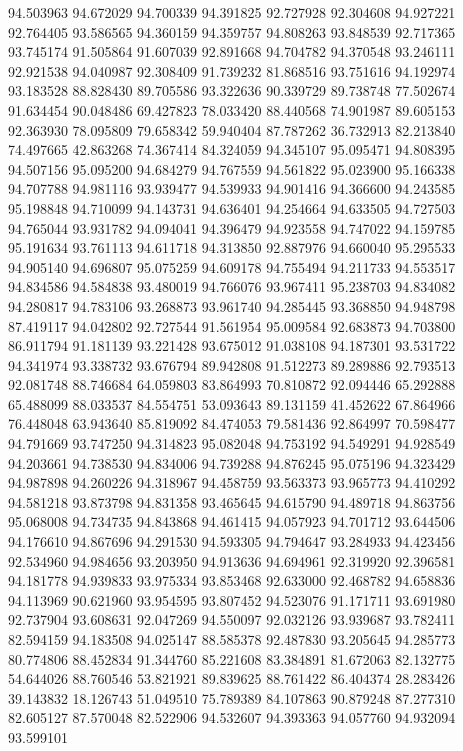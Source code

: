 94.503963
94.672029
94.700339
94.391825
92.727928
92.304608
94.927221
92.764405
93.586565
94.360159
94.359757
94.808263
93.848539
92.717365
93.745174
91.505864
91.607039
92.891668
94.704782
94.370548
93.246111
92.921538
94.040987
92.308409
91.739232
81.868516
93.751616
94.192974
93.183528
88.828430
89.705586
93.322636
90.339729
89.738748
77.502674
91.634454
90.048486
69.427823
78.033420
88.440568
74.901987
89.605153
92.363930
78.095809
79.658342
59.940404
87.787262
36.732913
82.213840
74.497665
42.863268
74.367414
84.324059
94.345107
95.095471
94.808395
94.507156
95.095200
94.684279
94.767559
94.561822
95.023900
95.166338
94.707788
94.981116
93.939477
94.539933
94.901416
94.366600
94.243585
95.198848
94.710099
94.143731
94.636401
94.254664
94.633505
94.727503
94.765044
93.931782
94.094041
94.396479
94.923558
94.747022
94.159785
95.191634
93.761113
94.611718
94.313850
92.887976
94.660040
95.295533
94.905140
94.696807
95.075259
94.609178
94.755494
94.211733
94.553517
94.834586
94.584838
93.480019
94.766076
93.967411
95.238703
94.834082
94.280817
94.783106
93.268873
93.961740
94.285445
93.368850
94.948798
87.419117
94.042802
92.727544
91.561954
95.009584
92.683873
94.703800
86.911794
91.181139
93.221428
93.675012
91.038108
94.187301
93.531722
94.341974
93.338732
93.676794
89.942808
91.512273
89.289886
92.793513
92.081748
88.746684
64.059803
83.864993
70.810872
92.094446
65.292888
65.488099
88.033537
84.554751
53.093643
89.131159
41.452622
67.864966
76.448048
63.943640
85.819092
84.474053
79.581436
92.864997
70.598477
94.791669
93.747250
94.314823
95.082048
94.753192
94.549291
94.928549
94.203661
94.738530
94.834006
94.739288
94.876245
95.075196
94.323429
94.987898
94.260226
94.318967
94.458759
93.563373
93.965773
94.410292
94.581218
93.873798
94.831358
93.465645
94.615790
94.489718
94.863756
95.068008
94.734735
94.843868
94.461415
94.057923
94.701712
93.644506
94.176610
94.867696
94.291530
94.593305
94.794647
93.284933
94.423456
92.534960
94.984656
93.203950
94.913636
94.694961
92.319920
92.396581
94.181778
94.939833
93.975334
93.853468
92.633000
92.468782
94.658836
94.113969
90.621960
93.954595
93.807452
94.523076
91.171711
93.691980
92.737904
93.608631
92.047269
94.550097
92.032126
93.939687
93.782411
82.594159
94.183508
94.025147
88.585378
92.487830
93.205645
94.285773
80.774806
88.452834
91.344760
85.221608
83.384891
81.672063
82.132775
54.644026
88.760546
53.821921
89.839625
88.761422
86.404374
28.283426
39.143832
18.126743
51.049510
75.789389
84.107863
90.879248
87.277310
82.605127
87.570048
82.522906
94.532607
94.393363
94.057760
94.932094
93.599101

